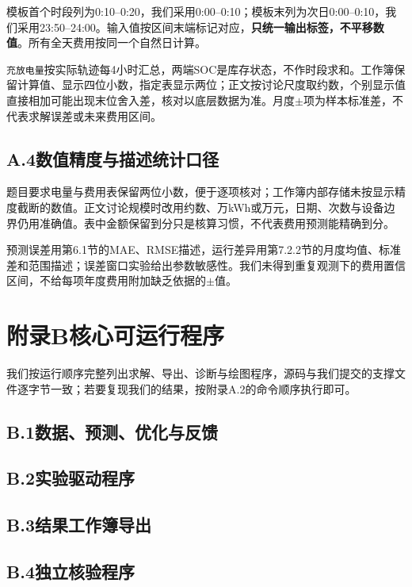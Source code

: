 \documentclass[UTF8,fontset=none,a4paper,zihao=-4]{ctexart}
\begin{document}
模板首个时段列为0:10--0:20，我们采用0:00--0:10；模板末列为次日0:00--0:10，我们采用23:50--24:00。输入值按区间末端标记对应，\textbf{只统一输出标签，不平移数值}。所有全天费用按同一个自然日计算。

\texttt{充放电量}按实际轨迹每4小时汇总，两端SOC是库存状态，不作时段求和。工作簿保留计算值、显示四位小数，指定表显示两位；正文按讨论尺度取约数，个别显示值直接相加可能出现末位舍入差，核对以底层数据为准。月度\(\pm\)项为样本标准差，不代表求解误差或未来费用区间。

\subsection*{A.4\quad 数值精度与描述统计口径}
题目要求电量与费用表保留两位小数，便于逐项核对；工作簿内部存储未按显示精度截断的数值。正文讨论规模时改用约数、万kWh或万元，日期、次数与设备边界仍用准确值。表中金额保留到分只是核算习惯，不代表费用预测能精确到分。

预测误差用第6.1节的MAE、RMSE描述，运行差异用第7.2.2节的月度均值、标准差和范围描述；误差窗口实验给出参数敏感性。我们未得到重复观测下的费用置信区间，不给每项年度费用附加缺乏依据的\(\pm\)值。

\clearpage
\section*{附录B\quad 核心可运行程序}
\begingroup{}
我们按运行顺序完整列出求解、导出、诊断与绘图程序，源码与我们提交的支撑文件逐字节一致；若要复现我们的结果，按附录A.2的命令顺序执行即可。
\subsection*{B.1\quad 数据、预测、优化与反馈}

\subsection*{B.2\quad 实验驱动程序}

\subsection*{B.3\quad 结果工作簿导出}

\subsection*{B.4\quad 独立核验程序}

\end{document}
